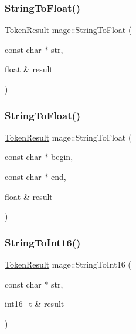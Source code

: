 \hypertarget{namespacemage_a9353f738019573cfa93e504978bf6584}{}\label{namespacemage_a9353f738019573cfa93e504978bf6584} 
\subsubsection{\texorpdfstring{String\+To\+Float()}{StringToFloat()}\hspace{0.1cm}{\footnotesize\ttfamily [1/2]}}
{\footnotesize\ttfamily \hyperlink{namespacemage_a2178ba2411db5912f41b2e7698c2037d}{Token\+Result} mage\+::\+String\+To\+Float (\begin{DoxyParamCaption}\item[{const char $\ast$}]{str,  }\item[{float \&}]{result }\end{DoxyParamCaption})}

\hypertarget{namespacemage_a8610747ad641d27135bcd3a3d3c6b6c2}{}\label{namespacemage_a8610747ad641d27135bcd3a3d3c6b6c2} 
\subsubsection{\texorpdfstring{String\+To\+Float()}{StringToFloat()}\hspace{0.1cm}{\footnotesize\ttfamily [2/2]}}
{\footnotesize\ttfamily \hyperlink{namespacemage_a2178ba2411db5912f41b2e7698c2037d}{Token\+Result} mage\+::\+String\+To\+Float (\begin{DoxyParamCaption}\item[{const char $\ast$}]{begin,  }\item[{const char $\ast$}]{end,  }\item[{float \&}]{result }\end{DoxyParamCaption})}

\hypertarget{namespacemage_a5889574dc8d73ffa614ad8541e0b312a}{}\label{namespacemage_a5889574dc8d73ffa614ad8541e0b312a} 
\subsubsection{\texorpdfstring{String\+To\+Int16()}{StringToInt16()}\hspace{0.1cm}{\footnotesize\ttfamily [1/2]}}
{\footnotesize\ttfamily \hyperlink{namespacemage_a2178ba2411db5912f41b2e7698c2037d}{Token\+Result} mage\+::\+String\+To\+Int16 (\begin{DoxyParamCaption}\item[{const char $\ast$}]{str,  }\item[{int16\+\_\+t \&}]{result }\end{DoxyParamCaption})}

